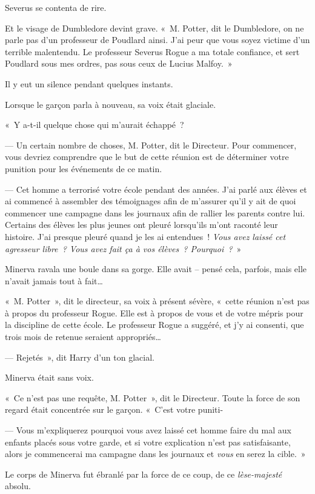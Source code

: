Severus se contenta de rire.

Et le visage de Dumbledore devint grave.
«~M. Potter, dit le Dumbledore, on ne parle pas d'un professeur de Poudlard ainsi.
J'ai peur que vous soyez victime d'un terrible malentendu.
Le professeur Severus Rogue a ma totale confiance, et sert Poudlard sous mes ordres, pas sous ceux de Lucius Malfoy.~»

Il y eut un silence pendant quelques instants.

Lorsque le garçon parla à nouveau, sa voix était glaciale.

«~Y a-t-il quelque chose qui m'aurait échappé~?

--- Un certain nombre de choses, M. Potter, dit le Directeur.
Pour commencer, vous devriez comprendre que le but de cette réunion est de déterminer votre punition pour les événements de ce matin.

--- Cet homme a terrorisé votre école pendant des années.
J'ai parlé aux élèves et ai commencé à assembler des témoignages afin de m'assurer qu'il y ait de quoi commencer une campagne dans les journaux afin de rallier les parents contre lui.
Certains des élèves les plus jeunes ont pleuré lorsqu'ils m'ont raconté leur histoire.
J'ai presque pleuré quand je les ai entendues~!
\emph{Vous avez laissé cet agresseur libre~?
Vous avez fait ça à vos élèves~?
Pourquoi~?}~»

Minerva ravala une boule dans sa gorge.
Elle avait -- pensé cela, parfois, mais elle n'avait jamais tout à fait…

«~M. Potter~», dit le directeur, sa voix à présent sévère, «~cette réunion n'est pas à propos du professeur Rogue.
Elle est à propos de vous et de votre mépris pour la discipline de cette école.
Le professeur Rogue a suggéré, et j'y ai consenti, que trois mois de retenue seraient appropriés…

--- Rejetés~», dit Harry d'un ton glacial.

Minerva était sans voix.

«~Ce n'est pas une requête, M. Potter~», dit le Directeur.
Toute la force de son regard était concentrée sur le garçon.
«~C'est votre puniti-

--- Vous m'expliquerez pourquoi vous avez laissé cet homme faire du mal aux enfants placés sous votre garde, et si votre explication n'est pas satisfaisante, alors je commencerai ma campagne dans les journaux et \emph{vous} en serez la cible.~»

Le corps de Minerva fut ébranlé par la force de ce coup, de ce \emph{lèse-majesté} absolu.

